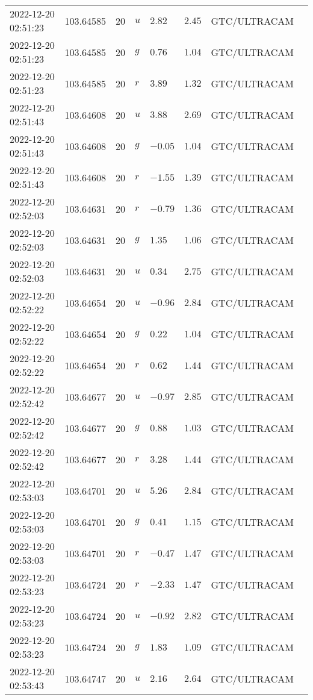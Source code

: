 \documentclass{nature_plusfigure}
\begin{document}
\begin{supplement}
\begin{center}
\begin{longtable}{llllllll}
2022-12-20 02:51:23 & 103.64585 & 20 & $u$ & $2.82$ & $2.45$ & GTC/ULTRACAM &  \\ 
2022-12-20 02:51:23 & 103.64585 & 20 & $g$ & $0.76$ & $1.04$ & GTC/ULTRACAM &  \\ 
2022-12-20 02:51:23 & 103.64585 & 20 & $r$ & $3.89$ & $1.32$ & GTC/ULTRACAM &  \\ 
2022-12-20 02:51:43 & 103.64608 & 20 & $u$ & $3.88$ & $2.69$ & GTC/ULTRACAM &  \\ 
2022-12-20 02:51:43 & 103.64608 & 20 & $g$ & $-0.05$ & $1.04$ & GTC/ULTRACAM &  \\ 
2022-12-20 02:51:43 & 103.64608 & 20 & $r$ & $-1.55$ & $1.39$ & GTC/ULTRACAM &  \\ 
2022-12-20 02:52:03 & 103.64631 & 20 & $r$ & $-0.79$ & $1.36$ & GTC/ULTRACAM &  \\ 
2022-12-20 02:52:03 & 103.64631 & 20 & $g$ & $1.35$ & $1.06$ & GTC/ULTRACAM &  \\ 
2022-12-20 02:52:03 & 103.64631 & 20 & $u$ & $0.34$ & $2.75$ & GTC/ULTRACAM &  \\ 
2022-12-20 02:52:22 & 103.64654 & 20 & $u$ & $-0.96$ & $2.84$ & GTC/ULTRACAM &  \\ 
2022-12-20 02:52:22 & 103.64654 & 20 & $g$ & $0.22$ & $1.04$ & GTC/ULTRACAM &  \\ 
2022-12-20 02:52:22 & 103.64654 & 20 & $r$ & $0.62$ & $1.44$ & GTC/ULTRACAM &  \\ 
2022-12-20 02:52:42 & 103.64677 & 20 & $u$ & $-0.97$ & $2.85$ & GTC/ULTRACAM &  \\ 
2022-12-20 02:52:42 & 103.64677 & 20 & $g$ & $0.88$ & $1.03$ & GTC/ULTRACAM &  \\ 
2022-12-20 02:52:42 & 103.64677 & 20 & $r$ & $3.28$ & $1.44$ & GTC/ULTRACAM &  \\ 
2022-12-20 02:53:03 & 103.64701 & 20 & $u$ & $5.26$ & $2.84$ & GTC/ULTRACAM &  \\ 
2022-12-20 02:53:03 & 103.64701 & 20 & $g$ & $0.41$ & $1.15$ & GTC/ULTRACAM &  \\ 
2022-12-20 02:53:03 & 103.64701 & 20 & $r$ & $-0.47$ & $1.47$ & GTC/ULTRACAM &  \\ 
2022-12-20 02:53:23 & 103.64724 & 20 & $r$ & $-2.33$ & $1.47$ & GTC/ULTRACAM &  \\ 
2022-12-20 02:53:23 & 103.64724 & 20 & $u$ & $-0.92$ & $2.82$ & GTC/ULTRACAM &  \\ 
2022-12-20 02:53:23 & 103.64724 & 20 & $g$ & $1.83$ & $1.09$ & GTC/ULTRACAM &  \\ 
2022-12-20 02:53:43 & 103.64747 & 20 & $u$ & $2.16$ & $2.64$ & GTC/ULTRACAM &  \\ 

\end{longtable}
\end{center}
\end{supplement}
\end{document}
